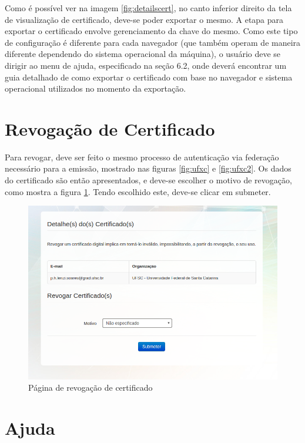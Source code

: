 Como é possível ver na imagem \ref{fig:detailscert}, no canto inferior direito da tela de visualização de certificado, deve-se poder exportar o mesmo. A etapa para exportar o certificado envolve gerenciamento da chave do mesmo. Como este tipo de configuração é diferente para cada navegador (que também operam de maneira diferente dependendo do sistema operacional da máquina), o usuário deve se dirigir ao menu de ajuda, especificado na seção 6.2, onde deverá encontrar um guia detalhado de como exportar o certificado com base no navegador e sistema operacional utilizados no momento da exportação.

\section{Revogação de Certificado}

Para revogar, deve ser feito o mesmo processo de autenticação via federação necessário para a emissão, mostrado nas figuras \ref{fig:ufxc} e \ref{fig:ufxc2}. Os dados do certificado são então apresentados, e deve-se escolher o motivo de revogação, como mostra a figura \ref{fig:revoke}. Tendo escolhido este, deve-se clicar em submeter.

\begin{figure}[ht]
     \centering
     \includegraphics[scale=0.5]{images/saec21revoke.png}
     \caption{Página de revogação de certificado}
     \label{fig:revoke}
\end{figure}

\section{Ajuda}

